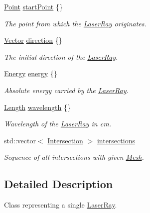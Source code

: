\begin{DoxyCompactItemize}
\item 
\hyperlink{classraytracer_1_1Point}{Point} \hyperlink{classraytracer_1_1LaserRay_a6970072ba9bbe9a958d9595386d39cc9}{start\+Point} \{\}
\begin{DoxyCompactList}\small\item\em The point from which the \hyperlink{classraytracer_1_1LaserRay}{Laser\+Ray} originates. \end{DoxyCompactList}\item 
\hyperlink{classraytracer_1_1Vector}{Vector} \hyperlink{classraytracer_1_1LaserRay_af50d079eead68440a707dfe63b2029d8}{direction} \{\}
\begin{DoxyCompactList}\small\item\em The initial direction of the \hyperlink{classraytracer_1_1LaserRay}{Laser\+Ray}. \end{DoxyCompactList}\item 
\hyperlink{structraytracer_1_1Energy}{Energy} \hyperlink{classraytracer_1_1LaserRay_a5434b2b8f9c1e5c695761e4c1147b00e}{energy} \{\}
\begin{DoxyCompactList}\small\item\em Absolute energy carried by the \hyperlink{classraytracer_1_1LaserRay}{Laser\+Ray}. \end{DoxyCompactList}\item 
\mbox{\label{classraytracer_1_1LaserRay_ae3b24463ade2202eb37972eb1cdb88e0}} 
\hyperlink{structraytracer_1_1Length}{Length} \hyperlink{classraytracer_1_1LaserRay_ae3b24463ade2202eb37972eb1cdb88e0}{wavelength} \{\}
\begin{DoxyCompactList}\small\item\em Wavelength of the \hyperlink{classraytracer_1_1LaserRay}{Laser\+Ray} in cm. \end{DoxyCompactList}\item 
std\+::vector$<$ \hyperlink{structraytracer_1_1Intersection}{Intersection} $>$ \hyperlink{classraytracer_1_1LaserRay_a2f15a3a20e496fdc6308d62d0a520bfd}{intersections}
\begin{DoxyCompactList}\small\item\em Sequence of all intersections with given \hyperlink{classraytracer_1_1Mesh}{Mesh}. \end{DoxyCompactList}\end{DoxyCompactItemize}


\subsection{Detailed Description}
Class representing a single \hyperlink{classraytracer_1_1LaserRay}{Laser\+Ray}. 

